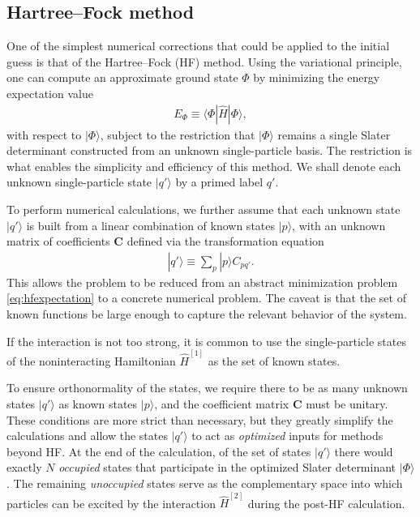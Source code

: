 \subsection{Hartree--Fock method}
\label{subsec:HartreeFockmethod}

One of the simplest numerical corrections that could be applied to the
initial guess is that of the Hartree--Fock (HF) method.  Using the
variational principle, one can compute an approximate ground state
$\Phi$ by minimizing the energy expectation value
\begin{align} \label{eq:hfexpectation}
  E_{\Phi} \equiv \langle \Phi | \hat H | \Phi \rangle,
\end{align}
with respect to $|\Phi\rangle$, subject to the restriction that
$|\Phi\rangle$ remains a single Slater determinant constructed from an
unknown single-particle basis.  The restriction is what enables the
simplicity and efficiency of this method.  We shall denote each
unknown single-particle state $|q'\rangle$ by a primed label $q'$.

To perform numerical calculations, we further assume that each unknown
state $|q'\rangle$ is built from a linear combination of known states
$|p\rangle$, with an unknown matrix of coefficients $\bm C$ defined
via the transformation equation
\begin{align*}
  |q'\rangle \equiv \sum_p |p\rangle C_{p q'}.
\end{align*}
This allows the problem to be reduced from an abstract minimization
problem \eqref{eq:hfexpectation} to a concrete numerical problem.  The
caveat is that the set of known functions be large enough to capture
the relevant behavior of the system.

If the interaction is not too strong, it is common to use the
single-particle states of the noninteracting Hamiltonian
$\hat{H}^{[1]}$ as the set of known states.

To ensure orthonormality of the states, we require there to be as many
unknown states $|q'\rangle$ as known states $|p\rangle$, and the
coefficient matrix $\bm C$ must be unitary.  These conditions are more
strict than necessary, but they greatly simplify the calculations and
allow the states $|q'\rangle$ to act as \textit{optimized} inputs for
methods beyond HF.  At the end of the calculation, of the set of
states $|q'\rangle$ there would exactly $N$ \textit{occupied} states
that participate in the optimized Slater determinant $|\Phi\rangle$.
The remaining \textit{unoccupied} states serve as the complementary
space into which particles can be excited by the interaction
$\hat{H}^{[2]}$ during the post-HF calculation.

